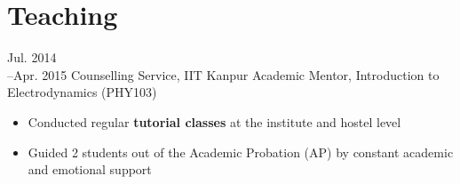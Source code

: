 \section{Teaching}
\cventry
	{Jul. 2014\\--Apr. 2015}
	{Counselling Service, IIT Kanpur}
	{Academic Mentor, Introduction to Electrodynamics (PHY103)}
	{}{}
	{
		\begin{itemize}
			\item {Conducted regular \textbf{tutorial classes} at the institute and hostel level}
			\item {Guided 2 students out of the Academic Probation (AP) by constant academic and emotional support }
		\end{itemize}
	}